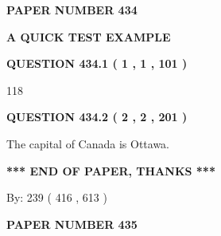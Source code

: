 \documentclass[12pt]{article}
\begin{document}
   
   
   
\newpage 
\setcounter{page}{ 
   434001 } 
   
   
   
   
 {\textbf{ \Large{ PAPER NUMBER  434  }}}
   
   
\vspace{0.2in}
   
   
   
   
   
   
 \vspace{0.2in}
{\LARGE {\textbf{ A QUICK TEST EXAMPLE}}}
   
   
  
\vspace{0.2in}
  
{\textbf{\Large{QUESTION
434.1 
 ( 1 , 1 , 101 )
}}}
  
  
 
 
\noindent{}

118
 
 
  
\vspace{0.2in}
  
{\textbf{\Large{QUESTION
434.2 
 ( 2 , 2 , 201 )
}}}
  
  
 
 
\noindent{}
 
 
The capital of Canada is Ottawa.
 
 
 
 
   
   
 \vspace{0.2in}
 
   
   
   
   
\vspace{1.0in} 
{\textbf{\large{ *** END OF PAPER, THANKS *** }}} 
   
   
\hspace{1.0in} By: 
 239 ( 416 ,  613 )
   
   
   
   
\newpage 
\setcounter{page}{ 
   435001 } 
   
   
   
   
 {\textbf{ \Large{ PAPER NUMBER  435  }}}
   
\end{document}
